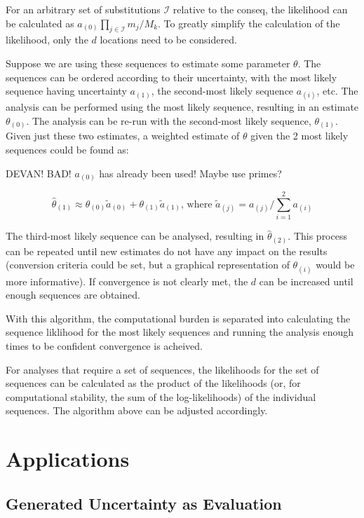 \documentclass[
]{article}
\begin{document}
For an arbitrary set of substitutions \(\mathcal{I}\) relative to the
conseq, the likelihood can be calculated as
\(a_{(0)}\prod_{j\in \mathcal{I}}m_j/M_k\). To greatly simplify the
calculation of the likelihood, only the \(d\) locations need to be
considered.

Suppose we are using these sequences to estimate some parameter
\(\theta\). The sequences can be ordered according to their uncertainty,
with the most likely sequence having uncertainty \(a_{(1)}\), the
second-most likely sequence \(a_{(i)}\), etc. The analysis can be
performed using the most likely sequence, resulting in an estimate
\(\theta_{(0)}\). The analysis can be re-run with the second-most likely
sequence, \(\theta_{(1)}\). Given just these two estimates, a weighted
estimate of \(\theta\) given the 2 most likely sequences could be found
as:

DEVAN! BAD! \(a_{(0)}\) has already been used! Maybe use primes?

\[
\hat\theta_{(1)} \approx \theta_{(0)} \tilde a_{(0)} + \theta_{(1)}\tilde a_{(1)}\text{, where }\tilde a_{(j)}=a_{(j)}/\sum_{i=1}^2a_{(i)}
\]

The third-most likely sequence can be analysed, resulting in
\(\hat\theta_{(2)}\). This process can be repeated until new estimates
do not have any impact on the results (conversion criteria could be set,
but a graphical representation of \(\theta_{(i)}\) would be more
informative). If convergence is not clearly met, the \(d\) can be
increased until enough sequences are obtained.

With this algorithm, the computational burden is separated into
calculating the sequence liklihood for the most likely sequences and
running the analysis enough times to be confident convergence is
acheived.

For analyses that require a set of sequences, the likelihoods for the
set of sequences can be calculated as the product of the likelihoods
(or, for computational stability, the sum of the log-likelihoods) of the
individual sequences. The algorithm above can be adjusted accordingly.

\hypertarget{applications}{%
\section{Applications}\label{applications}}

\hypertarget{generated-uncertainty-as-evaluation}{%
\subsection{Generated Uncertainty as
Evaluation}\label{generated-uncertainty-as-evaluation}}
\end{document}
